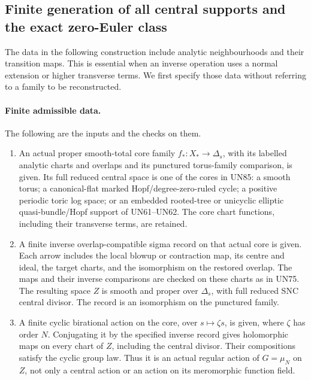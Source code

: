 \subsection{Finite generation of all central supports and the exact zero-Euler class}

The data in the following construction include analytic
neighbourhoods and their transition maps. This is essential
when an inverse operation uses a normal extension or higher
transverse terms. We first specify those data without
referring to a family to be reconstructed.

\paragraph{Finite admissible data.}
The following are the inputs and the checks on them.
\begin{enumerate}
\item An actual proper smooth-total core family
\(f_*:X_*\to\Delta_s\), with its labelled analytic
charts and overlaps and its punctured torus-family
comparison, is given. Its full reduced central space
is one of the cores in UN85: a smooth torus; a
canonical-flat marked Hopf/degree-zero-ruled cycle;
a positive periodic toric log space; or an embedded
rooted-tree or unicyclic elliptic quasi-bundle/Hopf
support of UN61--UN62. The core chart functions,
including their transverse terms, are retained.

\item A finite inverse overlap-compatible sigma record
on that actual core is given. Each arrow includes
the local blowup or contraction map, its centre
and ideal, the target charts, and the isomorphism
on the restored overlap. The maps and their inverse
comparisons are checked on these charts as in UN75.
The resulting space \(Z\) is smooth and proper over
\(\Delta_s\), with full reduced SNC central divisor.
The record is an isomorphism on the punctured family.

\item A finite cyclic birational action on the core,
over \(s\mapsto\zeta s\), is given, where \(\zeta\)
has order \(N\). Conjugating it by the specified
inverse record gives holomorphic maps on every
chart of \(Z\), including the central divisor.
Their compositions satisfy the cyclic group law.
Thus it is an actual regular action of
\(G=\mu_N\) on \(Z\), not only a central action
or an action on its meromorphic function field.


\end{enumerate}
